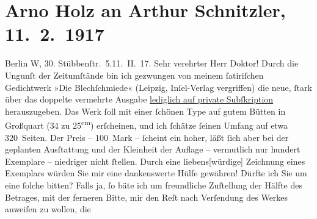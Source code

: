 

         \renewcommand{\erwaehnteInstitutionen}{Institutionen: Insel-Verlag, Petzschke & Gretschel}
         \renewcommand{\erwaehnteOrte}{Orte: Berlin, Dresden, Leipzig, Stübbenstraße, Wien}
         \renewcommand{\erwaehnteWerke}{Werke: Die Blechschmiede}
               \section[Arno Holz an Arthur Schnitzler, 11. 2. 1917]{ Arno Holz an Arthur Schnitzler, 11. 2. 1917}\nopagebreak{}\rehead{ }\begin{ledgroupsized}[t]{13cm}\normalsize\beginnumbering \toendnotes[C]{\smallbreak\pagebreak[2]} 
\pstart
           \raggedleft{}{\pb}Berlin W, 30. Stübbenſtr. 5.\hspace*{1.5em}11. II. 17. \pend
           \pstart\center{}Sehr verehrter Herr Doktor!\pend\pstart
           Durch die Ungunſt der Zeitumſtände bin ich gezwungen von meinem ſatiriſchen
                    Gedichtwerk »Die Blechſchmiede« (Leipzig, Inſel-Verlag vergriffen) die neue, ſtark über das doppelte vermehrte
                    Ausgabe \uline{lediglich auf private Subſkription}
                    herauszugeben. Das Werk ſoll mit einer ſchönen Type auf gutem Bütten in
                    Großquart (34 zu 25\textsuperscript{cm}) erſcheinen, und ich ſchätze
                    ſeinen Umfang auf etwa 320 Seiten. Der Preis – 100 Mark – ſcheint ein hoher,
                    läßt ſich aber bei der geplanten Ausſtattung und der Kleinheit der Auflage –
                    vermutlich nur hundert Exemplare – niedriger nicht ſtellen. Durch eine
                        liebens{[}würdige{]} Zeichnung eines Exemplars würden Sie mir
                    eine dankenswerte Hülfe gewähren! Dürfte ich Sie um eine ſolche bitten? Falls
                    ja, ſo bäte ich um freundliche Zuſtellung der Hälfte des Betrages, mit der
                    ferneren Bitte, mir den Reſt nach Verſendung des Werkes anweiſen zu wollen, die

\end{ledgroupsized}
